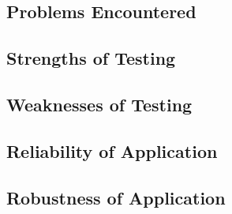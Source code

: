 \subsection{Problems Encountered}

\subsection{Strengths of Testing}

\subsection{Weaknesses of Testing}

\subsection{Reliability of Application}

\subsection{Robustness of Application}